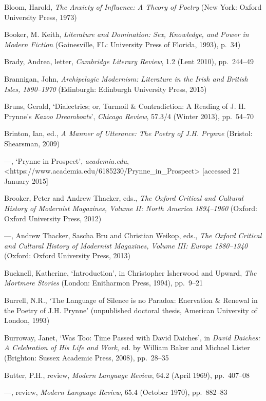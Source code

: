 \documentclass[]{article}
\begin{document}
Bloom, Harold, \emph{The Anxiety of Influence: A Theory of Poetry} (New
York: Oxford University Press, 1973)

Booker, M. Keith, \emph{Literature and Domination: Sex, Knowledge, and
Power in Modern Fiction} (Gainesville, FL: University Press of Florida,
1993), p.~34)

Brady, Andrea, letter, \emph{Cambridge Literary Review}, 1.2 (Lent
2010), pp.~244–49

Brannigan, John, \emph{Archipelagic Modernism: Literature in the Irish
and British Isles, 1890–1970} (Edinburgh: Edinburgh University Press,
2015)

Bruns, Gerald, ‘Dialectrics; or, Turmoil \& Contradiction: A Reading of
J. H. Prynne’s \emph{Kazoo Dreamboats}’, \emph{Chicago Review}, 57.3/4
(Winter 2013), pp.~54–70

Brinton, Ian, ed., \emph{A Manner of Utterance: The Poetry of J.H.
Prynne} (Bristol: Shearsman, 2009)

—, ‘Prynne in Prospect’, \emph{academia.edu},\\
\textless{}https://www.academia.edu/6185230/Prynne\_in\_Prospect\textgreater{}
{[}accessed 21 January 2015{]}

Brooker, Peter and Andrew Thacker, eds., \emph{The Oxford Critical and
Cultural History of Modernist Magazines, Volume II: North America
1894–1960} (Oxford: Oxford University Press, 2012)

—, Andrew Thacker, Sascha Bru and Christian Weikop, eds., \emph{The
Oxford Critical and Cultural History of Modernist Magazines, Volume III:
Europe 1880–1940} (Oxford: Oxford University Press, 2013)

Bucknell, Katherine, ‘Introduction’, in Christopher Isherwood and
Upward, \emph{The Mortmere Stories} (London: Enitharmon Press, 1994),
pp.~9–21

Burrell, N.R., ‘The Language of Silence is no Paradox: Enervation \&
Renewal in the Poetry of J.H. Prynne’ (unpublished doctoral thesis,
American University of London, 1993)

Burroway, Janet, ‘Was Too: Time Passed with David Daiches’, in
\emph{David Daiches: A Celebration of His Life and Work}, ed. by William
Baker and Michael Lister (Brighton: Sussex Academic Press, 2008),
pp.~28–35

Butter, P.H., review, \emph{Modern Language Review}, 64.2 (April 1969),
pp.~407–08

—, review, \emph{Modern Language Review}, 65.4 (October 1970),
pp.~882–83
\end{document}
